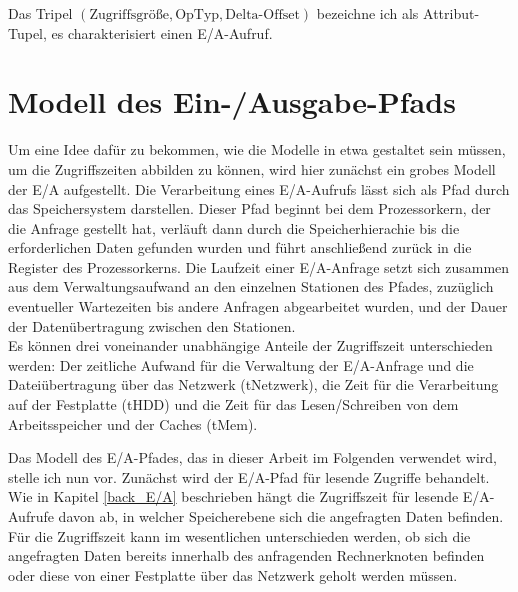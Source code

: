 \documentclass[
	twoside,
	12pt,
	a4paper,
	BCOR10mm,
	DIV14,
	listof=totoc,
	bibliography=totoc,
	headsepline
]{scrreprt}
\begin{document}
Das Tripel $(\mbox{Zugriffsgröße},\mbox{OpTyp},\mbox{Delta-Offset})$ bezeichne ich als Attribut-Tupel, es charakterisiert einen E/A-Aufruf.

\section{Modell des Ein-/Ausgabe-Pfads}
\label{analyse:ea_modell}
Um eine Idee dafür zu bekommen, wie die Modelle in etwa gestaltet sein müssen, um die Zugriffszeiten abbilden zu können, wird hier zunächst ein grobes Modell der E/A aufgestellt.
Die Verarbeitung eines E/A-Aufrufs lässt sich als Pfad durch das Speichersystem darstellen.
Dieser Pfad beginnt bei dem Prozessorkern, der die Anfrage gestellt hat, verläuft dann durch die Speicherhierachie bis die erforderlichen Daten gefunden wurden und führt anschließend zurück in die Register des Prozessorkerns.
Die Laufzeit einer E/A-Anfrage setzt sich zusammen aus dem Verwaltungsaufwand an den einzelnen Stationen des Pfades, zuzüglich eventueller Wartezeiten bis andere Anfragen abgearbeitet wurden, und der Dauer der Datenübertragung zwischen den Stationen.\\
Es können drei voneinander unabhängige Anteile der Zugriffszeit unterschieden werden:
Der zeitliche Aufwand für die Verwaltung der E/A-Anfrage und die Dateiübertragung über das Netzwerk (tNetzwerk), die Zeit für die Verarbeitung auf der Festplatte (tHDD) und die Zeit für das Lesen/Schreiben von dem Arbeitsspeicher und der Caches (tMem).\medskip

Das Modell des E/A-Pfades, das in dieser Arbeit im Folgenden verwendet wird, stelle ich nun vor. Zunächst wird der E/A-Pfad für lesende Zugriffe behandelt.
Wie in Kapitel \ref{back_E/A} beschrieben hängt die Zugriffszeit für lesende E/A-Aufrufe davon ab, in welcher Speicherebene sich die angefragten Daten befinden.
Für die Zugriffszeit kann im wesentlichen unterschieden werden, ob sich die angefragten Daten bereits innerhalb des anfragenden Rechnerknoten befinden oder diese von einer Festplatte über das Netzwerk geholt werden müssen.
\end{document}
